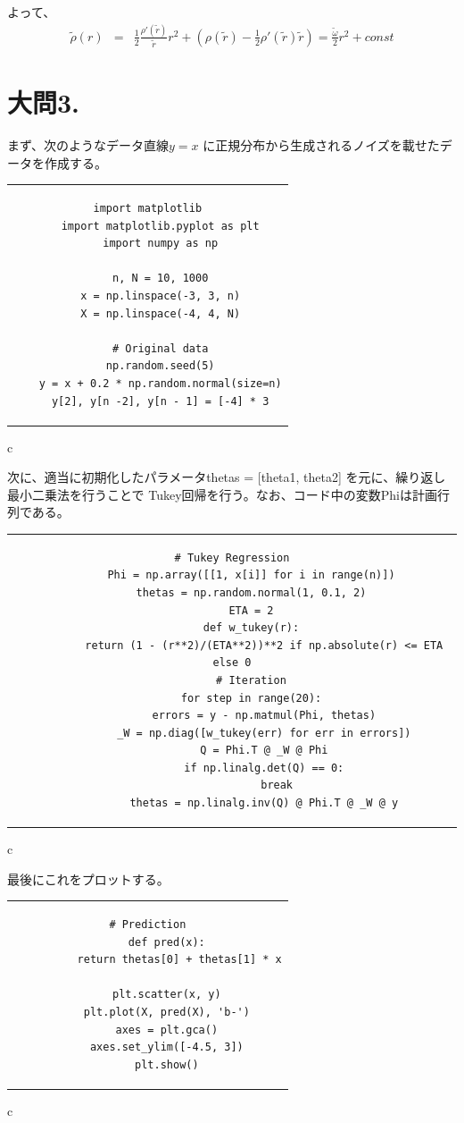 \documentclass[fleqn]{jsarticle}
\begin{document}
よって、
\begin{eqnarray*}
  \tilde{\rho}(r) &=& \frac{1}{2} \frac{\rho'(\tilde r)}{\tilde r} r^2
    + \left( \rho(\tilde r) - \frac{1}{2} \rho'(\tilde r) \tilde r \right)
  = \frac{\tilde \omega}{2} r^2 + const
\end{eqnarray*}

\newpage
\section*{大問3.}
まず、次のようなデータ直線$y=x$ に正規分布から生成されるノイズを載せたデータを作成する。
\begin{center}
\begin{tabular}{c}
  \begin{lstlisting}[]
    import matplotlib
    import matplotlib.pyplot as plt
    import numpy as np

    n, N = 10, 1000
    x = np.linspace(-3, 3, n)
    X = np.linspace(-4, 4, N)

    # Original data
    np.random.seed(5)
    y = x + 0.2 * np.random.normal(size=n)
    y[2], y[n -2], y[n - 1] = [-4] * 3
  \end{lstlisting}
\end{tabular}{c}
\end{center}


次に、適当に初期化したパラメータthetas = [theta1, theta2] を元に、繰り返し最小二乗法を行うことで
Tukey回帰を行う。なお、コード中の変数Phiは計画行列である。
\begin{center}
  \begin{tabular}{c}
    \begin{lstlisting}[]
      # Tukey Regression
      Phi = np.array([[1, x[i]] for i in range(n)])
      thetas = np.random.normal(1, 0.1, 2)
      ETA = 2
      def w_tukey(r):
          return (1 - (r**2)/(ETA**2))**2 if np.absolute(r) <= ETA else 0
      # Iteration
      for step in range(20):
          errors = y - np.matmul(Phi, thetas)
          _W = np.diag([w_tukey(err) for err in errors])
          Q = Phi.T @ _W @ Phi
          if np.linalg.det(Q) == 0:
              break
          thetas = np.linalg.inv(Q) @ Phi.T @ _W @ y
    \end{lstlisting}
  \end{tabular}{c}
\end{center}

最後にこれをプロットする。
\begin{center}
  \begin{tabular}{c}
    \begin{lstlisting}[]
      # Prediction
      def pred(x):
          return thetas[0] + thetas[1] * x

      plt.scatter(x, y)
      plt.plot(X, pred(X), 'b-')
      axes = plt.gca()
      axes.set_ylim([-4.5, 3])
      plt.show()
    \end{lstlisting}
  \end{tabular}{c}
\end{center}
\end{document}

